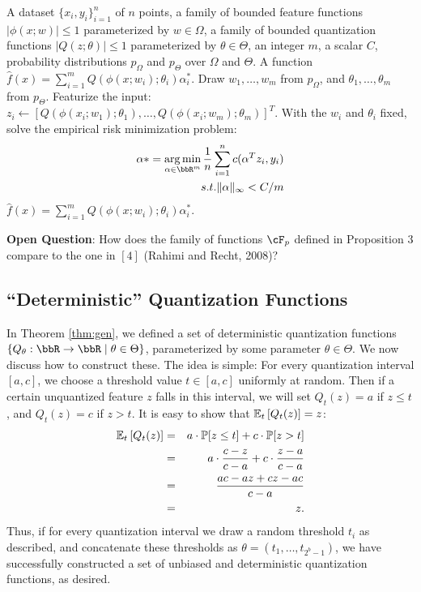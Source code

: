 \documentclass[12pt]{article}
\begin{document}
\begin{algorithm}
\caption{%
	Low-Precision Weighted Sum of Random Kitchen Sinks Training (adapted from $[4]$)%
}
\label{alg:lprff}
\begin{algorithmic}[1]
	\renewcommand{\algorithmicrequire}{\textbf{Input}}
	\REQUIRE
	A dataset $\{x_i,y_i\}_{i=1}^n$ of $n$ points, a family of bounded feature functions $|\phi(x;w)|\leq 1$ parameterized by $w\in\Omega$, a family of bounded quantization functions $|Q(z;\theta)| \leq 1$ parameterized by $\theta \in \Theta$, an integer $m$, a scalar $C$, probability distributions  $p_{\Omega}$ and $p_{\Theta}$ over $\Omega$ and $\Theta$.
	\renewcommand{\algorithmicrequire}{\textbf{Output}}
	\REQUIRE
	A function $\hat{f}(x) = \sum_{i=1}^m Q(\phi(x;w_i);\theta_i) \alpha^*_i$.
	\STATE Draw $w_1,\ldots,w_m$ from $p_{\Omega}$, and $\theta_1,\ldots,\theta_m$ from $p_{\Theta}$.
	\STATE Featurize the input: $z_i \leftarrow [Q(\phi(x_i;w_1);\theta_1),\ldots,Q(\phi(x_i;w_m);\theta_m)]^T$.
	\STATE With the $w_i$ and $\theta_i$ fixed, solve the empirical risk minimization problem:
	\begin{eqnarray*}
		\alpha* =\argmin_{\alpha\in\RR^m} \frac{1}{n}\sum_{i=1}^n c(\alpha^T z_i,y_i)\\
		s.t. \|\alpha\|_\infty < C/m
	\end{eqnarray*}
	\RETURN $\hat{f}(x) = \sum_{i=1}^m Q(\phi(x;w_i);\theta_i) \alpha^*_i$.
\end{algorithmic}
\end{algorithm}


\noindent \textbf{Open Question}: How does the family of functions $\cF_p$ defined in Proposition 3 compare to the one in $[4]$ (Rahimi and Recht, 2008)?	

\subsection{``Deterministic'' Quantization Functions}
\label{sec:deterministic}
In Theorem \ref{thm:gen}, we defined a set of deterministic quantization functions
$\{Q_{\theta}:\RR\rightarrow\RR \;|\; \theta\in\Theta \}$, parameterized by some parameter $\theta\in\Theta$.
We now discuss how to construct these.  The idea is simple: For every quantization interval $[a,c]$, we choose a threshold value $t \in [a,c]$ uniformly at random.  Then if a certain unquantized feature $z$ falls in this interval, we will set $Q_t(z)= a$ if $z \leq t$, and $Q_t(z) = c$ if $z > t$.  It is easy to show that $\expect{t}{Q_t(z)} = z$:
\begin{eqnarray*}
	\expect{t}{Q_t(z)} &=& a \cdot \Prob[z \leq t] + c \cdot \Prob[z > t]  \\
	&=& a \cdot \frac{c-z}{c-a} + c\cdot \frac{z-a}{c-a} \\
	&=& \frac{ac - az + cz - ac}{c-a} \\
	&=& z.
\end{eqnarray*}
Thus, if for every quantization interval we draw a random threshold $t_i$ as described, and concatenate these thresholds as $\theta = (t_1,\ldots,t_{2^b-1})$, we have successfully constructed a set of unbiased and deterministic quantization functions, as desired.
\end{document}
